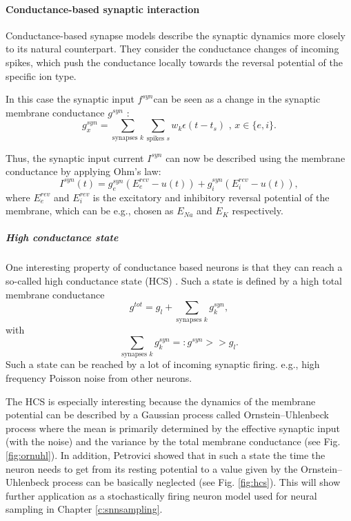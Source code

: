 \paragraph{Conductance-based synaptic interaction} \label{c:coba}
Conductance-based synapse models describe the synaptic dynamics more closely to its natural counterpart. They consider the conductance changes of incoming spikes, which push the conductance locally towards the reversal potential of the specific ion type. 

In this case the synaptic input $f^{syn} $can be seen as a change in the synaptic membrane conductance $g^{syn}$ :
\[
g_x^{syn} = \sum_{\text{synapses } k } \sum_{\text{spikes } s} w_k \epsilon(t - t_s) \text{ ,      } x \in \{e, i\}.
\]

Thus, the synaptic input current $I^{syn}$ can now be described using the membrane conductance by applying Ohm's law:
\[
I^{syn}(t) = g_e^{syn} (E_e^{rev} - u(t)) + g_i^{syn} (E_i^{rev} - u(t)),
\]
where $E_e^{rev}$ and $E_i^{rev}$ is the excitatory and inhibitory reversal potential of the membrane, which can be e.g., chosen as $E_{Na}$ and $E_{K}$ respectively.  

\subparagraph{High conductance state} \label{c:hcs}
One interesting property of conductance based neurons is that they can reach a so-called high conductance state (HCS) \cite{Petrovici2016}. Such a state is defined by a high total membrane conductance 
\[
g^{tot} = g_l + \sum_{\text{synapses } k} g_k^{syn},
\]
with 
\[
\sum_{\text{synapses } k} g_k^{syn} =: g^{syn} >> g_l .
\]
Such a state can be reached by a lot of incoming synaptic firing. e.g., high frequency Poisson noise from other neurons. 

The HCS is especially interesting because the dynamics of the membrane potential can be described by a Gaussian process called Ornstein–Uhlenbeck process where the mean is primarily determined by the effective synaptic input (with the noise) and the variance by the total membrane conductance (see Fig. \ref{fig:ornuhl}).
In addition, Petrovici showed that in such a state the time the neuron needs to get from its resting potential to a value given by the Ornstein–Uhlenbeck process can be basically neglected (see Fig. \ref{fig:hcs}).
This will show further application as a stochastically firing neuron model used for neural sampling  in Chapter \ref{c:snnsampling}.


